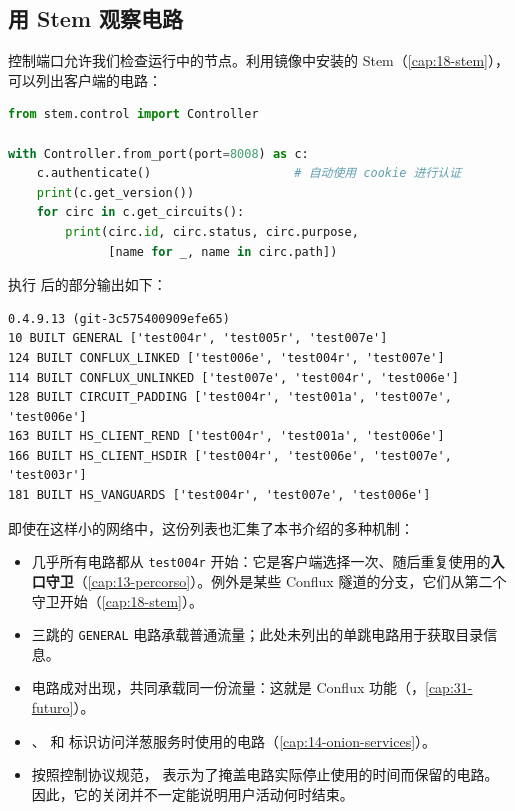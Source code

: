\subsection{用 Stem 观察电路}\label{sec:rp-stem}

控制端口允许我们检查运行中的节点。利用镜像中安装的 Stem（\cref{cap:18-stem}），可以列出客户端的电路：
\begin{lstlisting}[language=Python]
from stem.control import Controller

with Controller.from_port(port=8008) as c:
    c.authenticate()                    # 自动使用 cookie 进行认证
    print(c.get_version())
    for circ in c.get_circuits():
        print(circ.id, circ.status, circ.purpose,
              [name for _, name in circ.path])
\end{lstlisting}
执行  后的部分输出如下：
\begin{lstlisting}[numbers=none]
0.4.9.13 (git-3c575400909efe65)
10 BUILT GENERAL ['test004r', 'test005r', 'test007e']
124 BUILT CONFLUX_LINKED ['test006e', 'test004r', 'test007e']
114 BUILT CONFLUX_UNLINKED ['test007e', 'test004r', 'test006e']
128 BUILT CIRCUIT_PADDING ['test004r', 'test001a', 'test007e', 'test006e']
163 BUILT HS_CLIENT_REND ['test004r', 'test001a', 'test006e']
166 BUILT HS_CLIENT_HSDIR ['test004r', 'test006e', 'test007e', 'test003r']
181 BUILT HS_VANGUARDS ['test004r', 'test007e', 'test006e']
\end{lstlisting}

即使在这样小的网络中，这份列表也汇集了本书介绍的多种机制：
\begin{itemize}
  \item 几乎所有电路都从 \texttt{test004r} 开始：它是客户端选择一次、随后重复使用的\textbf{入口守卫}（\cref{cap:13-percorso}）。例外是某些 Conflux 隧道的分支，它们从第二个守卫开始（\cref{cap:18-stem}）。
  \item 三跳的 \texttt{GENERAL} 电路承载普通流量；此处未列出的单跳电路用于获取目录信息。
  \item {} 电路成对出现，共同承载同一份流量：这就是 Conflux 功能（，\cref{cap:31-futuro}）。
  \item {}、 和  标识访问洋葱服务时使用的电路（\cref{cap:14-onion-services}）。
  \item 按照控制协议规范， 表示为了掩盖电路实际停止使用的时间而保留的电路。因此，它的关闭并不一定能说明用户活动何时结束。
\end{itemize}

